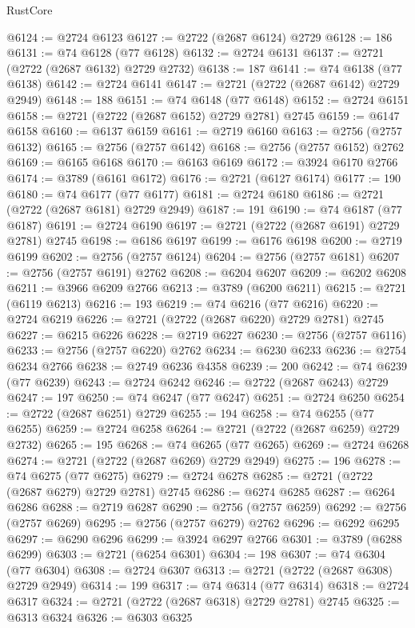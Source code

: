 \begin{lexlean}{RustCore}
\begin{coremodule}
@6124 := @2724 @6123
@6127 := @2722 (@2687 @6124) @2729
@6128 := 186
@6131 := @74 @6128 (@77 @6128)
@6132 := @2724 @6131
@6137 := @2721 (@2722 (@2687 @6132) @2729 @2732)
@6138 := 187
@6141 := @74 @6138 (@77 @6138)
@6142 := @2724 @6141
@6147 := @2721 (@2722 (@2687 @6142) @2729 @2949)
@6148 := 188
@6151 := @74 @6148 (@77 @6148)
@6152 := @2724 @6151
@6158 := @2721 (@2722 (@2687 @6152) @2729 @2781) @2745
@6159 := @6147 @6158
@6160 := @6137 @6159
@6161 := @2719 @6160
@6163 := @2756 (@2757 @6132)
@6165 := @2756 (@2757 @6142)
@6168 := @2756 (@2757 @6152) @2762
@6169 := @6165 @6168
@6170 := @6163 @6169
@6172 := @3924 @6170 @2766
@6174 := @3789 (@6161 @6172)
@6176 := @2721 (@6127 @6174)
@6177 := 190
@6180 := @74 @6177 (@77 @6177)
@6181 := @2724 @6180
@6186 := @2721 (@2722 (@2687 @6181) @2729 @2949)
@6187 := 191
@6190 := @74 @6187 (@77 @6187)
@6191 := @2724 @6190
@6197 := @2721 (@2722 (@2687 @6191) @2729 @2781) @2745
@6198 := @6186 @6197
@6199 := @6176 @6198
@6200 := @2719 @6199
@6202 := @2756 (@2757 @6124)
@6204 := @2756 (@2757 @6181)
@6207 := @2756 (@2757 @6191) @2762
@6208 := @6204 @6207
@6209 := @6202 @6208
@6211 := @3966 @6209 @2766
@6213 := @3789 (@6200 @6211)
@6215 := @2721 (@6119 @6213)
@6216 := 193
@6219 := @74 @6216 (@77 @6216)
@6220 := @2724 @6219
@6226 := @2721 (@2722 (@2687 @6220) @2729 @2781) @2745
@6227 := @6215 @6226
@6228 := @2719 @6227
@6230 := @2756 (@2757 @6116)
@6233 := @2756 (@2757 @6220) @2762
@6234 := @6230 @6233
@6236 := @2754 @6234 @2766
@6238 := @2749 @6236 @4358
@6239 := 200
@6242 := @74 @6239 (@77 @6239)
@6243 := @2724 @6242
@6246 := @2722 (@2687 @6243) @2729
@6247 := 197
@6250 := @74 @6247 (@77 @6247)
@6251 := @2724 @6250
@6254 := @2722 (@2687 @6251) @2729
@6255 := 194
@6258 := @74 @6255 (@77 @6255)
@6259 := @2724 @6258
@6264 := @2721 (@2722 (@2687 @6259) @2729 @2732)
@6265 := 195
@6268 := @74 @6265 (@77 @6265)
@6269 := @2724 @6268
@6274 := @2721 (@2722 (@2687 @6269) @2729 @2949)
@6275 := 196
@6278 := @74 @6275 (@77 @6275)
@6279 := @2724 @6278
@6285 := @2721 (@2722 (@2687 @6279) @2729 @2781) @2745
@6286 := @6274 @6285
@6287 := @6264 @6286
@6288 := @2719 @6287
@6290 := @2756 (@2757 @6259)
@6292 := @2756 (@2757 @6269)
@6295 := @2756 (@2757 @6279) @2762
@6296 := @6292 @6295
@6297 := @6290 @6296
@6299 := @3924 @6297 @2766
@6301 := @3789 (@6288 @6299)
@6303 := @2721 (@6254 @6301)
@6304 := 198
@6307 := @74 @6304 (@77 @6304)
@6308 := @2724 @6307
@6313 := @2721 (@2722 (@2687 @6308) @2729 @2949)
@6314 := 199
@6317 := @74 @6314 (@77 @6314)
@6318 := @2724 @6317
@6324 := @2721 (@2722 (@2687 @6318) @2729 @2781) @2745
@6325 := @6313 @6324
@6326 := @6303 @6325

\end{coremodule}
\end{lexlean}
